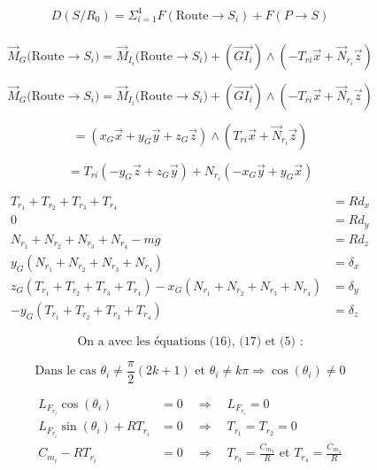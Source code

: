 \documentclass[a4paper,12pt]{report}  %
\begin{document}
\begin{align}
	D(S/R_0) = \Sigma_{i=1}^{4}{F}(\text{Route} \rightarrow S_i) + {F}(P \rightarrow S) \\
\end{align}




$$
\vec{M}_{G}({\text{Route} \rightarrow S_i)} = \vec{M}_{I_i}({\text{Route}\rightarrow S_i)} + \left( \overrightarrow{GI_i} \right) \wedge (-{T}_{ri}\vec{x} + \vec{N}_{r_i} \vec{z})
$$

$$
\vec{M}_{G}({\text{Route} \rightarrow S_i)} = \vec{M}_{I_i}({\text{Route}\rightarrow S_i)} + \left( \overrightarrow{GI_i} \right) \wedge (-{T}_{ri}\vec{x} + \vec{N}_{r_i} \vec{z})
$$

$$
=(x_G \vec{x} + y_G \vec{y} + z_G \vec{z}) \wedge ({T}_{ri}\vec{x} + \vec{N}_{r_i} \vec{z}) 
$$



$$
={T}_{ri}(-y_G \vec{z} + z_G \vec{y}) + N_{r_i}(-x_G\vec{y} +  y_G\vec{x}) 
$$


\begin{align}
	T_{r_1}+T_{r_2}+T_{r_3}+T_{r_4} &= Rd_x \tag{13}\\
	0 &= Rd_y \tag{14} \\
	N_{r_1}+N_{r_2}+N_{r_3}+N_{r_4}-mg &= Rd_z \tag{15} \\
	y_G(N_{r_1}+N_{r_2}+N_{r_3}+N_{r_4}) &= δ_x \tag{16} \\
	z_G(T_{r_1}+T_{r_2}+T_{r_3}+T_{r_4}) - x_G(N_{r_1}+N_{r_2}+N_{r_3}+N_{r_4}) &= δ_y \tag{17} \\
	-y_G(T_{r_1}+T_{r_2}+T_{r_3}+T_{r_4}) &= δ_z \tag{18}
\end{align}





$$
\text{On a avec les équations (16), (17) et (5) :}
$$

$$
\text{Dans le cas } \theta_i \neq \frac{\pi}{2}(2k+1)\text{ et } \theta_i \neq k\pi 
\Rightarrow \cos(\theta_i) \neq 0
$$



\begin{align}
	L_{F_{r_i}} \cos(\theta_i) &= 0 \quad \Rightarrow \quad L_{F_{r_i}} = 0 \\
	L_{F_{r_i}} \sin(\theta_i) + R T_{r_i} &= 0 \quad \Rightarrow \quad T_{r_1} = T_{r_2} = 0 \\
	C_{m_i} - R T_{r_i} &= 0 \quad \Rightarrow \quad T_{r_3} = \frac{C_{m_3}}{R} \text{ et } T_{r_4} = \frac{C_{m_4}}{R}
\end{align}
\end{document}

